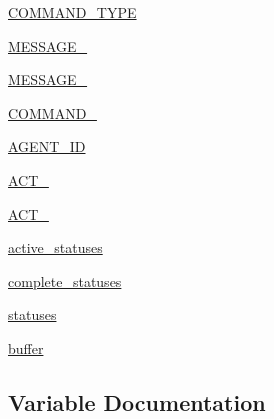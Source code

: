 \begin{DoxyCompactItemize}
\item 
\hyperlink{namespaceparlai_1_1mturk_1_1core_1_1dev_1_1test_1_1test__mturk__agent_a7e6fc885aa8009129bfb1fd046489ac3}{C\+O\+M\+M\+A\+N\+D\+\_\+\+T\+Y\+PE}
\item 
\hyperlink{namespaceparlai_1_1mturk_1_1core_1_1dev_1_1test_1_1test__mturk__agent_a40bc8a7a7309809e02032b14ae44fa4c}{M\+E\+S\+S\+A\+G\+E\+\_}
\item 
\hyperlink{namespaceparlai_1_1mturk_1_1core_1_1dev_1_1test_1_1test__mturk__agent_acd49ba3b1d4fe70f6ae8b363cebb8f7c}{M\+E\+S\+S\+A\+G\+E\+\_}
\item 
\hyperlink{namespaceparlai_1_1mturk_1_1core_1_1dev_1_1test_1_1test__mturk__agent_a5e4d52326499d238e7646ae3a82b4017}{C\+O\+M\+M\+A\+N\+D\+\_}
\item 
\hyperlink{namespaceparlai_1_1mturk_1_1core_1_1dev_1_1test_1_1test__mturk__agent_abdee5d2b9d7cf1b54914574da631f20e}{A\+G\+E\+N\+T\+\_\+\+ID}
\item 
\hyperlink{namespaceparlai_1_1mturk_1_1core_1_1dev_1_1test_1_1test__mturk__agent_a242ae0429f328819f49d141d48152ca7}{A\+C\+T\+\_}
\item 
\hyperlink{namespaceparlai_1_1mturk_1_1core_1_1dev_1_1test_1_1test__mturk__agent_a31ff6bf0c64c125046d91fc17a6ceb7f}{A\+C\+T\+\_}
\item 
\hyperlink{namespaceparlai_1_1mturk_1_1core_1_1dev_1_1test_1_1test__mturk__agent_a0f5a0a3c592e8e078802084d0a3faa19}{active\+\_\+statuses}
\item 
\hyperlink{namespaceparlai_1_1mturk_1_1core_1_1dev_1_1test_1_1test__mturk__agent_a98c5e4a3e99b8b136ba2b1660efbe577}{complete\+\_\+statuses}
\item 
\hyperlink{namespaceparlai_1_1mturk_1_1core_1_1dev_1_1test_1_1test__mturk__agent_ad35360ada400673bddb871306751880c}{statuses}
\item 
\hyperlink{namespaceparlai_1_1mturk_1_1core_1_1dev_1_1test_1_1test__mturk__agent_ac6aecad8f2e5240457f367be12f6f388}{buffer}
\end{DoxyCompactItemize}


\subsection{Variable Documentation}
\mbox{\label{namespaceparlai_1_1mturk_1_1core_1_1dev_1_1test_1_1test__mturk__agent_a242ae0429f328819f49d141d48152ca7}} 

